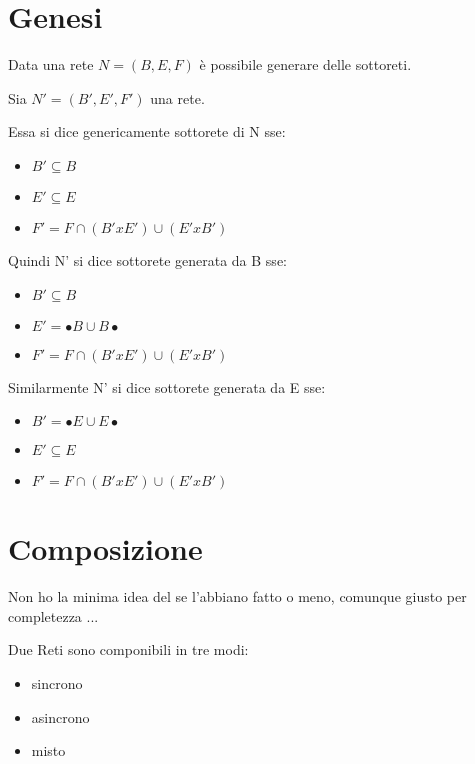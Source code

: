 \section{Genesi}

Data una rete $N = (B, E, F)$ \`e possibile generare delle sottoreti.

Sia $N' = (B', E', F')$ una rete.

Essa si dice genericamente sottorete di N sse:
\begin{itemize}
  \item $B' \subseteq B$
  \item $E' \subseteq E$
  \item $F' = F \cap (B' x E') \cup (E' x B')$
\end{itemize}

Quindi N' si dice sottorete generata da B sse:
\begin{itemize}
  \item $B' \subseteq B$
  \item $E' = \bullet B \cup B \bullet$
  \item $F' = F \cap (B' x E') \cup (E' x B')$
\end{itemize}

Similarmente N' si dice sottorete generata da E sse:
\begin{itemize}
  \item $B' = \bullet E \cup E \bullet$
  \item $E' \subseteq E$
  \item $F' = F \cap (B' x E') \cup (E' x B')$
\end{itemize}

\section{Composizione}

Non ho la minima idea del se l'abbiano fatto o meno, comunque giusto per completezza ...

Due Reti sono componibili in tre modi:
\begin{itemize}
  \item sincrono
  \item asincrono
  \item misto
\end{itemize}

